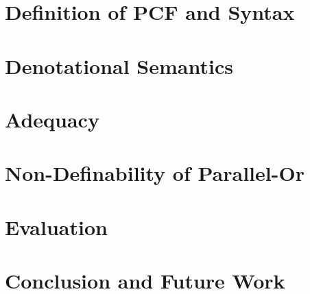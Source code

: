 \documentclass{report}
\begin{document}
\chapter{Definition of PCF and Syntax}




\chapter{Denotational Semantics}


\chapter{Adequacy}




\chapter{Non-Definability of Parallel-Or}


\chapter{Evaluation}

\chapter{Conclusion and Future Work}



\end{document}
